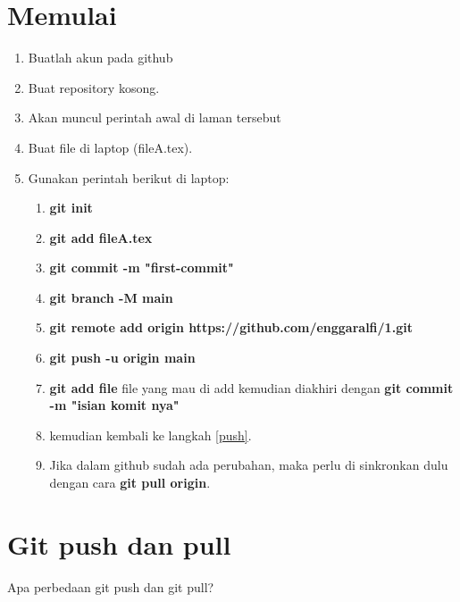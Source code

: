 \documentclass{Academic}
\begin{document}
\myabstract{}
\renewcommand{\myTitle}{Catatan dan tatacara menggunakan git dan github}
\renewcommand{\MyAuthor}{Enggar Alfianto}
\renewcommand{\MyDepartment}{Graduate School of Engineering Osaka University}
\renewcommand{\ID}{1234567}
\renewcommand{\Keywords}{Keyword 1, Keyword 2, Keyword 3}
\maketitle
\onehalfspacing

\section{Memulai}

\begin{enumerate}
    \item Buatlah akun pada github
    \item Buat repository kosong.
    \item Akan muncul perintah awal di laman tersebut
    \item Buat file di laptop (fileA.tex).
    \item Gunakan perintah berikut di laptop:
    \begin{enumerate}
        \item \textbf{git init}
        \item \textbf{git add fileA.tex}
        \item \textbf{git commit -m "first-commit"}
        \item \textbf{git branch -M main}
        \item \textbf{git remote add origin https://github.com/enggaralfi/1.git}
        \item \textbf{git push -u origin main} \label{push}
        \item \textbf{git add file} file yang mau di add kemudian diakhiri dengan \textbf{git commit -m "isian komit nya"}
        \item kemudian kembali ke langkah \ref{push}.
        \item Jika dalam github sudah ada perubahan, maka perlu di sinkronkan dulu dengan cara \textbf{git pull origin}.
    \end{enumerate}
\end{enumerate}

\section{Git push dan pull}
Apa perbedaan git push dan git pull?
\end{document}
